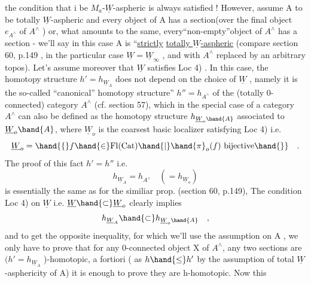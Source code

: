 
the condition that i be $M_a$-$\underline{W}$-aspheric is always satisfied !\hand{)} However,
 assume A to be totally $\underline{W}$-aspheric and every object of A has a
section(over the final object $e_{A^{\wedge}}$ of $A^{\wedge}$ ) or, what amounts to the
same, every``non-empty''\hand{/}object of $A^{\wedge}$ has a section - 
 we'll say in this case A is ``\uline{strictly}  \uline{totally $\underline{W}$-aspheric}
(compare section 60, p.149 , in the particular case $\underline{W} = \underline{W}_{\infty}$ , and
with $A^{\wedge}$ replaced by an arbitrary topos). Let's assume moreover that
$\underline{W}$ satisfies Loc 4) . In this case, the homotopy structure $h' = h_{\underline{W}_A}$
does not depend on the choice of $\underline{W}$ , namely it is the so-called
``canonical'' homotopy structure'' $h'' = h_{A^{\wedge}}$ of the  (totally 0-connected)
category $A^{\wedge}$ (cf. section 57), which in the special case of a category
$A^{\wedge}$ can also be defined as the homotopy structure $h_{\underline{W}_o\hand{A}}$ associated to
$\underline{W}_o\hand{A}$, where $\underline{W}_o$ is the coarsest basic localizer satisfying Loc 4) i.e.
\[ \underline{W}_o = \hand{\{} f \hand{\in} \mathrm{Fl}(\mathrm{Cat}) \hand{|} \hand{\pi}_o(f) \text{ bijective}\hand{\}} \quad . \]
The proof of this fact  $h' = h''$ i.e.
\[ h_{\underline{W}_A} = h_{A^{\wedge}} \quad ( = h_{\underline{W}_o} ) \]
is essentially the same as for the similiar prop. (section 60, p.149),
The condition Loc 4) on $\underline{W}$ i.e. $\underline{W} \hand{\subset} \underline{W}_o$ clearly implies
\[ h_{\underline{W}_A} \hand{\subset} h_{\underline{W}_o\hand{A}} \quad , \]
and to get the opposite inequality, for which we'll use the assumption
on A , we only have to prove that for any 0-connected object X of $A^{\wedge}$,
any two sections are $(h'=h_{\underline{W}_A}$ )-homotopic, a fortiori ( as $h \hand{\leq} h'$
by the assumption of total $\underline{W}$-asphericity of A) it is enough to prove
they are h-homotopic. Now this 
%
 

